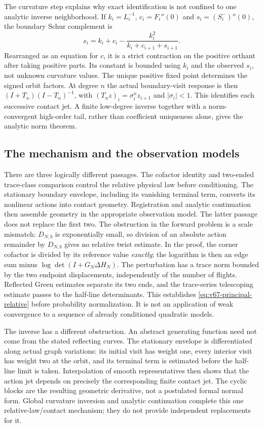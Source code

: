 The curvature step explains why exact identification is not confined to
one analytic inverse neighborhood.  If $k_i=L_i^{-1}$,
$c_i=F_i''(0)$ and $s_i=(S_i^-)''(0)$, the boundary Schur complement is
\[
 s_i=k_i+c_i-\frac{k_i^2}{k_i+c_{i+1}+s_{i+1}}.
\]
Rearranged as an equation for $c$, it is a strict contraction on the
positive orthant after taking positive parts.  Its constant is bounded
using $k_i$ and the observed $s_i$, not unknown curvature values.
The unique positive fixed point determines the signed orbit factors.
At degree $n$ the actual boundary-visit response is then
$(I+T_n)(I-T_n)^{-1}$, with
$(T_n z)_i=\sigma_i^n z_{i+1}$ and $|\sigma_i|<1$.
This identifies each successive contact jet.  A finite low-degree
inverse together with a norm-convergent high-order tail, rather than
coefficient uniqueness alone, gives the analytic norm theorem.

\subsection{The mechanism and the observation models}

There are three logically different passages.  The cofactor identity and
two-ended trace-class comparison control the relative physical law before
conditioning.  The stationary boundary envelope, including its vanishing
terminal term, converts its nonlinear actions into contact geometry.
Registration and analytic continuation then assemble geometry in the
appropriate observation model.  The latter passage does not replace the
first two.  The obstruction in the forward problem is a scale mismatch:
$D_{N,b}$ is exponentially small, so division of an absolute action
remainder by $D_{N,b}$ gives no relative twist estimate.  In the proof,
the corner cofactor is divided by its reference value \emph{exactly};
the logarithm is then an edge sum minus
$\log\det(I+G_N\Delta H_N)$.  The perturbation has a trace norm
bounded by the two endpoint displacements, independently of the number
of flights.  Reflected Green estimates separate its two ends, and the
trace-series telescoping estimate passes to the half-line determinants.
This establishes \eqref{eq:v67-principal-relative} before probability
normalization.  It is not an application of weak convergence to a
sequence of already conditioned quadratic models.

The inverse has a different obstruction.  An abstract generating
function need not come from the stated reflecting curves.  The
stationary envelope is differentiated along actual graph variations:
its initial visit has weight one, every interior visit has weight two
at the orbit, and its terminal term is estimated before the half-line
limit is taken.  Interpolation of smooth representatives then shows
that the action jet depends on precisely the corresponding finite
contact jet.  The cyclic blocks are the resulting geometric derivative,
not a postulated formal normal form.  Global curvature inversion and
analytic continuation complete this one relative-law/contact mechanism;
they do not provide independent replacements for it.

